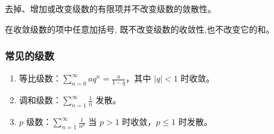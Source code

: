 \begin{theorem}
    去掉、增加或改变级数的有限项并不改变级数的敛散性。
\end{theorem}

\begin{theorem}
    在收敛级数的项中任意加括号, 既不改变级数的收敛性,也不改变它的和。
\end{theorem}

\subsubsection{常见的级数}

\begin{enumerate}
    \item 等比级数：$\sum\limits_{n=0}^{\infty} a q^{n} = \frac{a}{1-q}$，其中 $|q| < 1$ 时收敛。
    \item 调和级数：$\sum\limits_{n=1}^{\infty} \frac{1}{n}$ 发散。
    \item $p$ 级数：$\sum\limits_{n=1}^{\infty} \frac{1}{n^{p}}$ 当 $p > 1$ 时收敛，$p \leq 1$ 时发散。
\end{enumerate}